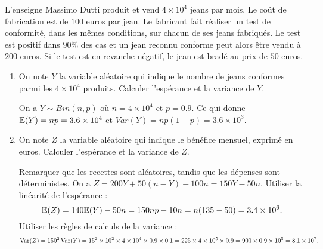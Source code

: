 \documentclass{article}
\begin{document}
%
%
L'enseigne \og Massimo Dutti \fg{} produit et vend $4\times10^{4}$ jeans par mois. Le coût de fabrication est de $100$ euros par jean. Le fabricant fait réaliser un test de conformité, dans les mêmes conditions, sur chacun de ses jeans fabriqués. Le test est positif dans $90\%$ des cas et un jean reconnu conforme peut alors être vendu à $200$ euros. Si le test est en revanche négatif, le jean est bradé au prix de $50$ euros. 
\begin{enumerate}
\item On note $Y$ la variable aléatoire qui indique le nombre de jeans conformes parmi les $4\times10^{4}$ produits.  Calculer l'espérance et la variance de $Y$. 

	\medskip

	On a  $Y\sim Bin(n,p)$ où $n=4\times10^{4}$ et $p=0.9$. Ce qui donne $ \mathbb{E}(Y)=np= 3.6 \times 10^4$ et $Var(Y) = np(1-p)=3.6\times10^3$.

	\medskip

\item On note $Z$ la variable aléatoire qui indique le bénéfice mensuel, exprimé en euros. Calculer l'espérance et la variance de $Z$.

	\medskip

 Remarquer que les recettes sont aléatoires, tandis que les dépenses sont déterministes. On a $Z = 200 Y + 50(n - Y) - 100n = 150Y -50n$. Utiliser la linéarité de l'espérance :
\[
	\mathbb{E} (Z) = 140 \mathbb{E}(Y)- 50n = 150 np - 10n = n(135-50) =  3.4\times 10^6. 
\]
Utiliser les règles de calculs de la variance :
\[
	\operatorname{Var}(Z) = 150^2 \operatorname{Var}(Y) = 15^2 \times 10^2\times 4 \times 10^4 \times 0.9 \times 0.1 = 225\times 4 \times 10^5 \times 0.9  = 900\times 0.9 \times 10^5 =  8.1 \times 10^7.
\]

	\medskip


\end{enumerate}
\end{document}
